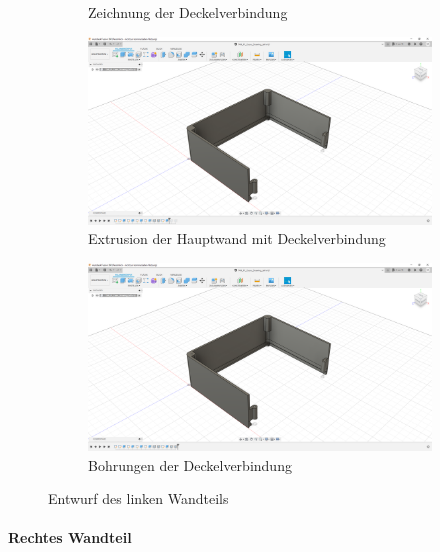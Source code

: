 \begin{figure}[h!tb]
\begin{subfigure}[t]{.3\linewidth}
		\caption[Zeichnung der Deckelverbindung]{Zeichnung der Deckelverbindung}
		\label{fig:design-left-09}
	\end{subfigure}
	\begin{subfigure}[t]{.3\linewidth}
		\includegraphics[width=\linewidth]{img/konstruktion_gehaeuse_links_010.png}
		\caption[Extrusion der Hauptwand mit Deckelverbindung]{Extrusion der Hauptwand mit Deckelverbindung}
		\label{fig:design-left-10}
	\end{subfigure}
	\begin{subfigure}[t]{.3\linewidth}
		\includegraphics[width=\linewidth]{img/konstruktion_gehaeuse_links_011.png}
		\caption[Bohrungen der Deckelverbindung]{Bohrungen der Deckelverbindung}
		\label{fig:design-left-11}
	\end{subfigure}
	\caption[Entwurf des linken Wandteils]{Entwurf des linken Wandteils}
	\label{fig:design-left}
\end{figure}\par
\paragraph{Rechtes Wandteil}

\newpage